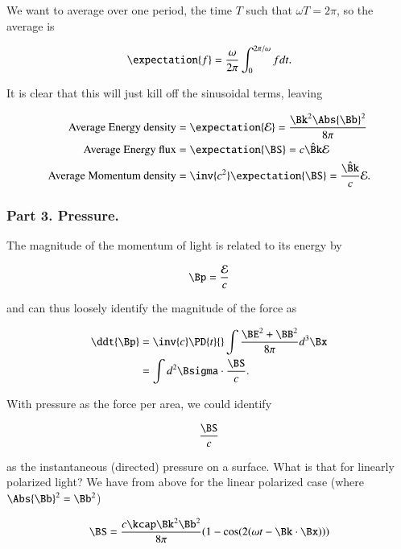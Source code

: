 We want to average over one period, the time $T$ such that $\omega T = 2 \pi$, so the average is

\begin{equation}\label{eqn:relativisticElectrodynamicsL16:360}
\expectation{f} = \frac{\omega}{2\pi} \int_0^{2\pi/\omega} f dt.
\end{equation}

It is clear that this will just kill off the sinusoidal terms, leaving

\begin{align}\label{eqn:relElectroDynProblemSet4:350b}
\mbox{Average Energy density} &= \expectation{\mathcal{E}} = \frac{ \Bk^2 \Abs{\Bb}^2 }{8\pi} \\
\mbox{Average Energy flux} &= \expectation{\BS} = c \hat{\Bk} \mathcal{E} \\
\mbox{Average Momentum density} &= \inv{c^2} \expectation{\BS} = \frac{\hat{\Bk}}{c} \mathcal{E}.
\end{align}

\subsubsection{Part 3.  Pressure.}

The magnitude of the momentum of light is related to its energy by

\begin{equation}\label{eqn:relElectroDynProblemSet4:351}
\Bp = \frac{\mathcal{E}}{c}
\end{equation}

and can thus loosely identify the magnitude of the force as 

\begin{align*}
\ddt{\Bp} 
&= \inv{c} \PD{t}{} \int \frac{\BE^2 + \BB^2}{8 \pi} d^3 \Bx \\
&= \int d^2 \Bsigma \cdot \frac{\BS}{c}.
\end{align*}

With pressure as the force per area, we could identify 

\begin{equation}\label{eqn:relElectroDynProblemSet4:252}
\frac{\BS}{c}
\end{equation}

as the instantaneous (directed) pressure on a surface.  What is that for linearly polarized light?  We have from above for the linear polarized case (where $\Abs{\Bb}^2 = \Bb^2$)

\begin{equation}\label{eqn:relElectroDynProblemSet4:353}
\BS = \frac{c \kcap \Bk^2 \Bb^2 }{8 \pi} ( 1 - \cos( 2 (\omega t - \Bk \cdot \Bx) ) )
\end{equation}

